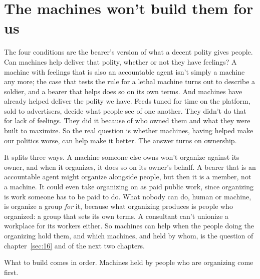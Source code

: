 \section{The machines won't build them for us}
\label{sec:25.5}
The four conditions are the bearer's version of what a decent polity gives people. Can machines help deliver that polity, whether or not they have feelings? A machine with feelings that is also an accountable agent isn't simply a machine any more; the case that tests the rule for a lethal machine turns out to describe a soldier, and a bearer that helps does so on its own terms. And machines have already helped deliver the polity we have. Feeds tuned for time on the platform, sold to advertisers, decide what people see of one another. They didn't do that for lack of feelings. They did it because of who owned them and what they were built to maximize. So the real question is whether machines, having helped make our politics worse, can help make it better. The answer turns on ownership.

It splits three ways. A machine someone else owns won't organize against its owner, and when it organizes, it does so on its owner's behalf.
A bearer that is an accountable agent might organize alongside people, but then it is a member, not a machine. It could even take organizing on as paid public work, since organizing is work someone has to be paid to do. What nobody can do, human or machine, is organize a group \emph{for} it, because what organizing produces is people who organized: a group that sets its own terms. A consultant can't unionize a workplace for its workers either. So machines can help when the people doing the organizing hold them, and which machines, and held by whom, is the question of chapter~\ref{sec:16} and of the next two chapters.

What to build comes in order. Machines held by people who are organizing come first.

